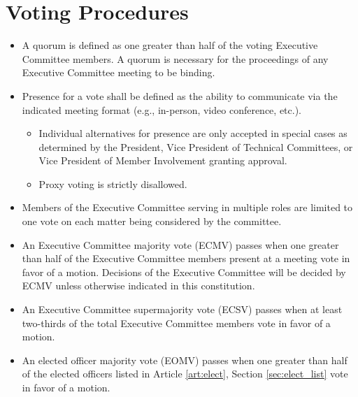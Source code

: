 \documentclass[12pt]{constitution}
\begin{document}
\section{Voting Procedures}
\label{sec:exec_vote}
\begin{itemize}
    \item A quorum is defined as one greater than half of the voting Executive Committee members. A quorum is necessary for the proceedings of any Executive Committee meeting to be binding.
    \item Presence for a vote shall be defined as the ability to communicate via the indicated meeting format (e.g., in-person, video conference, etc.).
    \begin{itemize}
        \item Individual alternatives for presence are only accepted in special cases as determined by the President, Vice President of Technical Committees, or Vice President of Member Involvement granting approval.
        \item Proxy voting is strictly disallowed.
    \end{itemize}
    \item Members of the Executive Committee serving in multiple roles are limited to one vote on each matter being considered by the committee.
    \item An Executive Committee majority vote (ECMV) passes when one greater than half of the Executive Committee members present at a meeting vote in favor of a motion. Decisions of the Executive Committee will be decided by ECMV unless otherwise indicated in this constitution.
    \item An Executive Committee supermajority vote (ECSV) passes when at least two-thirds of the total Executive Committee members vote in favor of a motion.
    \item An elected officer majority vote (EOMV) passes when one greater than half of the elected officers listed in Article \ref{art:elect}, Section \ref{sec:elect_list} vote in favor of a motion.
\end{itemize}
\end{document}
